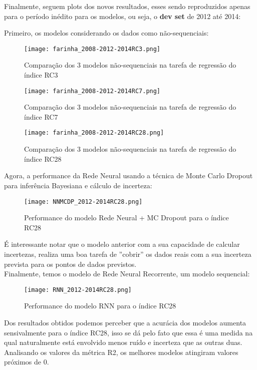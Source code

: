 Finalmente, seguem plots dos novos resultados, esses sendo reproduzidos apenas para o período inédito para os modelos, ou seja, o \textbf{dev set} de 2012 até 2014:


\bigskip
Primeiro, os modelos considerando os dados como não-sequenciais:

\begin{figure}[H]
\texttt{[image: farinha\_2008-2012-2014RC3.png]}
\caption{Comparação dos 3 modelos não-sequenciais na tarefa de regressão do índice RC3}
\end{figure}

\begin{figure}[H]
\texttt{[image: farinha\_2008-2012-2014RC7.png]}
\caption{Comparação dos 3 modelos não-sequenciais na tarefa de regressão do índice RC7}
\end{figure}

\begin{figure}[H]
\texttt{[image: farinha\_2008-2012-2014RC28.png]}
\caption{Comparação dos 3 modelos não-sequenciais na tarefa de regressão do índice RC28}
\end{figure}


Agora, a performance da Rede Neural usando a técnica de Monte Carlo Dropout para inferência Bayesiana e cálculo de incerteza:


\begin{figure}[H]
\texttt{[image: NNMCDP\_2012-2014RC28.png]}
\caption{Performance do modelo Rede Neural + MC Dropout para o índice RC28}
\end{figure}


É interessante notar que o modelo anterior com a sua capacidade de calcular incertezas, realiza uma boa tarefa de  ''cobrir'' os dados reais com a sua incerteza prevista para os pontos de dados previstos. \\ 

Finalmente, temos o modelo de Rede Neural Recorrente, um modelo sequencial:


\begin{figure}[H]
\texttt{[image: RNN\_2012-2014RC28.png]}
\caption{Performance do modelo RNN para o índice RC28}
\end{figure}


\bigskip

Dos resultados obtidos podemos perceber que a acurácia dos modelos aumenta sensivalmente para o índice RC28, isso se dá pelo fato que essa é uma medida na qual naturalmente está envolvido menos ruído e incerteza que as outras duas. Analisando os valores da métrica R2, os melhores modelos atingiram valores próximos de $0$.

